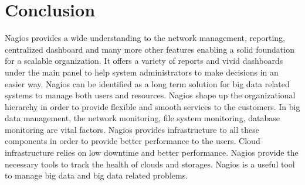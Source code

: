 \documentclass[9pt,twocolumn,twoside]{styles/osajnl}
\begin{document}
\section{Conclusion}

Nagios provides a wide understanding to the network management,
reporting, centralized dashboard and many more other features enabling
a solid foundation for a scalable organization. It offers a variety of
reports and vivid dashboards under the main panel to help system
administrators to make decisions in an easier way. Nagios can be
identified as a long term solution for big data related systems to
manage both users and resources.  Nagios shape up the organizational
hierarchy in order to provide flexible and smooth services to the
customers. In big data management, the network monitoring, file system
monitoring, database monitoring are vital factors. Nagios provides
infrastructure to all these components in order to provide better
performance to the users. Cloud infrastructure relies on low downtime
and better performance.  Nagios provide the necessary tools to track
the health of clouds and storages.  Nagios is a useful tool to manage
big data and big data related problems.



 
\end{document}
